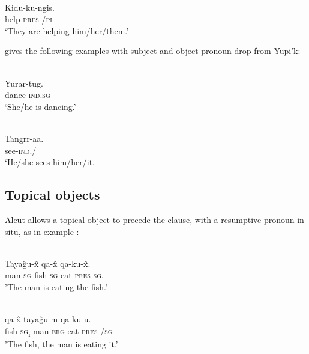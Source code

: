 \documentclass[output=paper]{LSP/langsci}
\begin{document}
 


\ea\label{ex:woolford:19}
\\
\gll Kidu-ku-ngis.       \\
     help-\textsc{pres}-/\textsc{pl}    \\
\glt ‘They are helping him/her/them.’
\z

\citet{bok1983on} gives the following examples with subject and object pronoun drop from Yupi’k:



\ea\label{ex:woolford:20}
\\
\gll Yurar-tug.   \\
     dance-\textsc{ind}.\textsc{sg}\\
\glt ‘She/he is dancing.’
\z

 


\ea\label{ex:woolford:21}
\\
\gll Tangrr-aa.   \\
     see-\textsc{ind}./ \\
\glt ‘He/she sees him/her/it.
\z

\subsection{Topical objects}

Aleut allows a topical object to precede the clause, with a resumptive pronoun in situ, as in example : 

\ea\label{ex:woolford:22}
\\
\gll Taya\^{g}u-\^{x}   qa-\^{x}     qa-ku-\^{x}.\\
     man-\textsc{sg}    fish-\textsc{sg}  eat-\textsc{pres}-\textsc{sg}.           \\
\glt 'The man is eating the fish.'
\z


\ea\label{ex:woolford:23}
\\
\gll qa-\^{x}     taya\^{g}u-m  qa-ku-u.                \\
     fish-\textsc{sg}\textsubscript{i}    man-\textsc{erg}  eat-\textsc{pres}-/\textsc{sg}\\
\glt 'The fish, the man is eating it.'
\z
\end{document}
